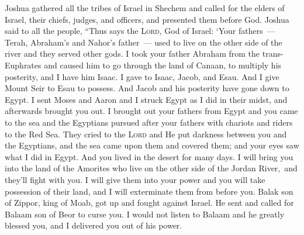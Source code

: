 
\begin{inparaenum}
     Joshua gathered all the tribes of Israel in Shechem and called for the elders of Israel, their chiefs, judges, and officers, and presented them before God.%
     Joshua said to all the people, ``Thus says the \textsc{Lord}, God of Israel: `Your fathers~--- Terah, Abraham's and Nahor's father~--- used to live on the other side of the river and they served other gods.%
     I took your father Abraham from the trans-Euphrates and caused him to go through the land of Canaan, to multiply his posterity, and I have him Isaac.%
     I gave to Isaac, Jacob, and Esau. And I give Mount Seir to Esau to possess. And Jacob and his posterity have gone down to Egypt.%
     I sent Moses and Aaron and I struck Egypt as I did in their midst, and afterwards brought you out.%
     I brought out your fathers from Egypt and you came to the sea and the Egyptians pursued after your fathers with chariots and riders to the Red Sea.%
     They cried to the \textsc{Lord} and He put darkness between you and the Egyptians, and the sea came upon them and covered them; and your eyes saw what I did in Egypt. And you lived in the desert for many days.%
     I will bring you into the land of the Amorites who live on the other side of the Jordan River,\understood\ and they'll fight with you. I will give them into your power and you will take possession of their land, and I will exterminate them from before you.%
     Balak son of Zippor, king of Moab, got up and fought against Israel. He sent and called for Balaam son of Beor to curse you.%
     I would not listen to Balaam and he greatly blessed you, and I delivered you out of his power.%

\end{inparaenum}
